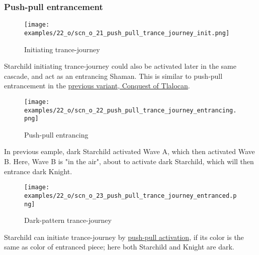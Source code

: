 \subsubsection*{Push-pull entrancement}

\vspace*{-0.9\baselineskip}
\noindent
\begin{wrapfigure}[7]{l}{0.4\textwidth}
\centering
\texttt{[image: examples/22\_o/scn\_o\_21\_push\_pull\_trance\_journey\_init.png]}
\caption{Initiating trance-journey}
\label{fig:scn_o_21_push_pull_trance_journey_init}
\end{wrapfigure}
Starchild initiating trance-journey could also be activated later in the same cascade, and act as an
entrancing Shaman. This is similar to push-pull entrancement in the
\hyperref[fig:star/scn_cot_33_push_pull_entrancement_start]{previous variant, Conquest of Tlalocan}.

\vspace*{3.9\baselineskip}
\noindent
\begin{wrapfigure}[10]{l}{0.4\textwidth}
\centering
\texttt{[image: examples/22\_o/scn\_o\_22\_push\_pull\_trance\_journey\_entrancing.png]}
\caption{Push-pull entrancing}
\label{fig:scn_o_22_push_pull_trance_journey_entrancing}
\end{wrapfigure}
In previous eample, dark Starchild activated Wave A, which then activated Wave B. Here, Wave B is
"in the air", about to activate dark Starchild, which will then entrance dark Knight.

\clearpage %

\noindent
\begin{figure}[!h]
\texttt{[image: examples/22\_o/scn\_o\_23\_push\_pull\_trance\_journey\_entranced.png]}
\caption{Dark-pattern trance-journey}
\label{fig:scn_o_23_push_pull_trance_journey_entranced}
\end{figure}

Starchild can initiate trance-journey by
\hyperref[sec:Terms/Push-pull activation]{push-pull activation},
if its color is the same as color of entranced piece; here both Starchild and Knight are dark.

